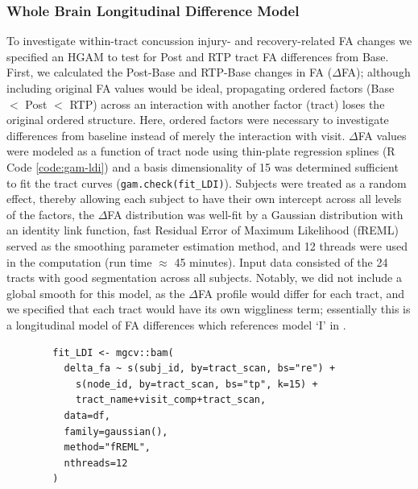 \documentclass[12pt]{article}
\begin{document}
\subsubsection{Whole Brain Longitudinal Difference Model}
\label{sssec:meth-gam-ldi}
To investigate within-tract concussion injury- and recovery-related FA changes we specified an HGAM to test for Post and RTP tract FA differences from Base. First, we calculated the Post-Base and RTP-Base changes in FA ($\Delta$FA); although including original FA values would be ideal, propagating ordered factors (Base $<$ Post $<$ RTP) across an interaction with another factor (tract) loses the original ordered structure. Here, ordered factors were necessary to investigate differences from baseline instead of merely the interaction with visit. $\Delta$FA values were modeled as a function of tract node using thin-plate regression splines (R Code \ref{code:gam-ldi}) and a basis dimensionality of 15 was determined sufficient to fit the tract curves (\lstinline{gam.check(fit_LDI)}). Subjects were treated as a random effect, thereby allowing each subject to have their own intercept across all levels of the factors, the $\Delta$FA distribution was well-fit by a Gaussian distribution with an identity link function, fast Residual Error of Maximum Likelihood (fREML) served as the smoothing parameter estimation method, and 12 threads were used in the computation (run time $\approx$ 45 minutes). Input data consisted of the 24 tracts with good segmentation across all subjects. Notably, we did not include a global smooth for this model, as the $\Delta$FA profile would differ for each tract, and we specified that each tract would have its own wiggliness term; essentially this is a longitudinal model of FA differences which references model `I' in \textcite{pedersen2019HierarchicalGeneralizedAdditive}.

\begin{equ}[H]
	\begin{lstlisting}
		fit_LDI <- mgcv::bam(
		  delta_fa ~ s(subj_id, by=tract_scan, bs="re") +
		    s(node_id, by=tract_scan, bs="tp", k=15) +
		    tract_name+visit_comp+tract_scan,
		  data=df,
		  family=gaussian(),
		  method="fREML",
		  nthreads=12
		)
	\end{lstlisting}
	\caption{$\Delta$FA values are modeled as a function of tract node with thin-plate regression smooths for each tract, accounting for the within-subject factors of tract and visit and using separate wiggliness terms for each tract. \lstinline{delta_fa} = RTP-Base and Post-Base FA differences, \lstinline{subj_id} = subject identifier factor, \lstinline{node_id} = node identifier integer, \lstinline{tract_name} = tract identifier factor, \lstinline{visit_comp} = visit comparison factor (RTP-Base, Post-Base), and \lstinline{tract_scan} = interaction of \lstinline{tract_name} and \lstinline{visit_comp}.}
	\label{code:gam-ldi}
\end{equ}
\end{document}
